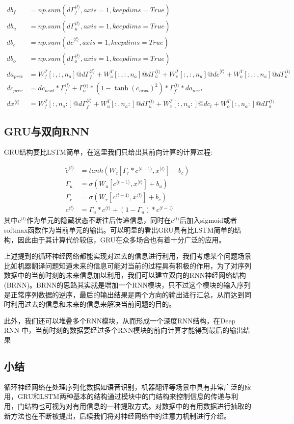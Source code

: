 \documentclass{ctexart}
\begin{document}
\begin{align*}
db_f &= np.sum(d\Gamma_f^{\langle t \rangle},axis=1,keepdims=True)\\
db_u &= np.sum(d\Gamma_u^{\langle t \rangle},axis=1,keepdims=True)\\
db_c &= np.sum(d\tilde{c}^{\langle t \rangle},axis=1,keepdims=True)\\
db_o &= np.sum(d\Gamma_o^{\langle t \rangle},axis=1,keepdims=True)\\
da_{prev} &= W_f^T[:,:,n_a]@d\Gamma_f^{\langle t \rangle} + W_u^T[:,:,n_a] @ d\Gamma_u^{\langle t \rangle}+ W_c^T[:,:,n_a] @ d\tilde c^{\langle t \rangle} + W_o^T[:,:,n_a] @ d\Gamma_o^{\langle t \rangle}\\
dc_{prev} &= dc_{next}*\Gamma_f^{\langle t \rangle} + \Gamma_o^{\langle t \rangle} * (1- \tanh(c_{next})^2)*\Gamma_f^{\langle t \rangle}*da_{next}\\
dx^{\langle t \rangle} &= W_f^T[:,n_a:]@d\Gamma_f^{\langle t \rangle} + W_u^T[:,n_a:] @ d\Gamma_u^{\langle t \rangle}+ W_c^T[:,n_a:] @ d\tilde c_t + W_o^T[:,n_a:] @ d\Gamma_o^{\langle t \rangle}
\end{align*}
\subsection{GRU与双向RNN}
GRU结构要比LSTM简单，在这里我们只给出其前向计算的计算过程:

\begin{align*}
\tilde{c}^{\langle t \rangle} &= tanh(W_c[\Gamma_r*c^{\langle t-1\rangle},x^{\langle t\rangle}] + b_c)\\
\Gamma_u &= \sigma(W_u[c^{\langle t-1\rangle},x^{\langle t\rangle}]+b_u)\\
\Gamma_r &= \sigma(W_r[c^{\langle t-1\rangle},x^{\langle t\rangle}]+b_c)\\
c^{\langle t\rangle} &= \Gamma_u*c^{\langle t\rangle} + (1-\Gamma_u)*c^{\langle t-1\rangle}
\end{align*}
其中$c^{\langle t\rangle}$作为单元的隐藏状态不断往后传递信息，同时在$c^{\langle t\rangle}$后加入sigmoid或者softmax函数作为当前单元的输出。可以明显的看出GRU具有比LSTM简单的结构，因此由于其计算代价较低，GRU在众多场合也有着十分广泛的应用。

上述提到的循环神经网络都能实现对过去的信息进行利用，我们考虑某个问题场景比如机器翻译问题知道未来的信息可能对当前的过程具有积极的作用，为了对序列数据中的当前时刻的未来信息加以利用，我们可以建立双向的RNN神经网络结构(BRNN)。BRNN的思路其实就是增加一个RNN模块，只不过这个模块的输入序列是正常序列数据的逆序，最后的输出结果是两个方向的输出进行汇总，从而达到同时利用过去的信息和未来的信息来解决当前问题的目的。

此外，我们还可以堆叠多个RNN模块，从而形成一个深度RNN结构，在Deep RNN 中，当前时刻的数据要经过多个RNN模块的前向计算才能得到最后的输出结果
\subsection{小结}
循环神经网络在处理序列化数据如语音识别，机器翻译等场景中具有非常广泛的应用，GRU和LSTM两种基本的结构通过模块中的门结构来控制信息的传递与利用，门结构也可视为对有用信息的一种提取方式。对数据中的有用数据进行抽取的新方法也在不断被提出，后续我们将对神经网络中的注意力机制进行介绍。
\end{document}

